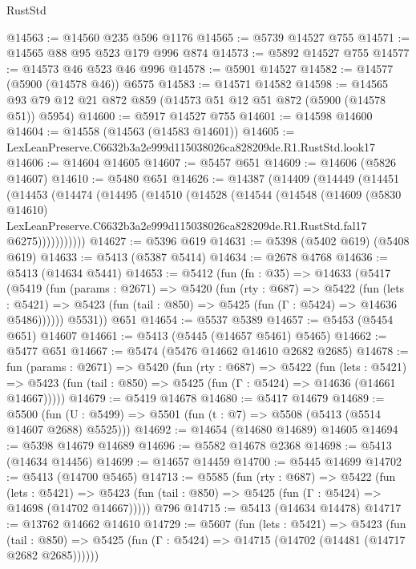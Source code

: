 \begin{lexlean}{RustStd}
\begin{coremodule}
@14563 := @14560 @235 @596 @1176
@14565 := @5739 @14527 @755
@14571 := @14565 @88 @95 @523 @179 @996 @874
@14573 := @5892 @14527 @755
@14577 := @14573 @46 @523 @46 @996
@14578 := @5901 @14527
@14582 := @14577 (@5900 (@14578 @46)) @6575
@14583 := @14571 @14582
@14598 := @14565 @93 @79 @12 @21 @872 @859 (@14573 @51 @12 @51 @872 (@5900 (@14578 @51)) @5954)
@14600 := @5917 @14527 @755
@14601 := @14598 @14600
@14604 := @14558 (@14563 (@14583 @14601))
@14605 := LexLeanPreserve.C6632b3a2e999d115038026ca828209de.R1.RustStd.look17
@14606 := @14604 @14605
@14607 := @5457 @651
@14609 := @14606 (@5826 @14607)
@14610 := @5480 @651
@14626 := @14387
    (@14409
      (@14449
        (@14451
          (@14453
            (@14474
              (@14495
                (@14510
                  (@14528
                    (@14544
                      (@14548
                        (@14609
                          (@5830 @14610)
                          LexLeanPreserve.C6632b3a2e999d115038026ca828209de.R1.RustStd.fal17
                          @6275)))))))))))
@14627 := @5396 @619
@14631 := @5398 (@5402 @619) (@5408 @619)
@14633 := @5413 (@5387 @5414)
@14634 := @2678 @4768
@14636 := @5413 (@14634 @5441)
@14653 := @5412
    (fun (fn : @35) =>
    @14633
      (@5417
        (@5419
          (fun (params : @2671) =>
          @5420
            (fun (rty : @687) =>
            @5422
              (fun (lets : @5421) =>
              @5423 (fun (tail : @850) => @5425 (fun (Γ : @5424) => @14636 @5486))))))
        @5531))
    @651
@14654 := @5537 @5389
@14657 := @5453 (@5454 @651) @14607
@14661 := @5413 (@5445 (@14657 @5461) @5465)
@14662 := @5477 @651
@14667 := @5474 (@5476 @14662 @14610 @2682 @2685)
@14678 := fun (params : @2671) =>
  @5420
    (fun (rty : @687) =>
    @5422
      (fun (lets : @5421) =>
      @5423 (fun (tail : @850) => @5425 (fun (Γ : @5424) => @14636 (@14661 @14667)))))
@14679 := @5419 @14678
@14680 := @5417 @14679
@14689 := @5500
    (fun (U : @5499) => @5501 (fun (t : @7) => @5508 (@5413 (@5514 @14607 @2688) @5525)))
@14692 := @14654 (@14680 @14689) @14605
@14694 := @5398 @14679 @14689
@14696 := @5582 @14678 @2368
@14698 := @5413 (@14634 @14456)
@14699 := @14657 @14459
@14700 := @5445 @14699
@14702 := @5413 (@14700 @5465)
@14713 := @5585
    (fun (rty : @687) =>
    @5422
      (fun (lets : @5421) =>
      @5423 (fun (tail : @850) => @5425 (fun (Γ : @5424) => @14698 (@14702 @14667)))))
    @796
@14715 := @5413 (@14634 @14478)
@14717 := @13762 @14662 @14610
@14729 := @5607
    (fun (lets : @5421) =>
    @5423
      (fun (tail : @850) =>
      @5425 (fun (Γ : @5424) => @14715 (@14702 (@14481 (@14717 @2682 @2685))))))

\end{coremodule}
\end{lexlean}
